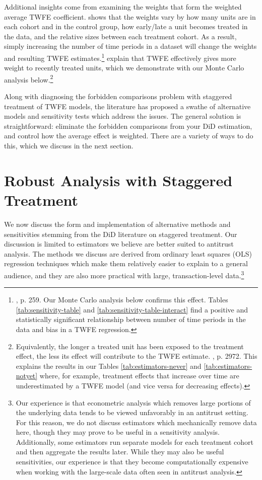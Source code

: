 \documentclass[12pt]{article}
\begin{document}
Additional insights come from examining the weights that form the weighted average TWFE coefficient. \citet{goodman-bacon2021a} shows that the weights vary by how many units are in each cohort and in the control group, how early/late a unit becomes treated in the data, and the relative sizes between each treatment cohort. As a result, simply increasing the number of time periods in a dataset will change the weights and resulting TWFE estimates.\footnote{\citet{goodman-bacon2021a}, p. 259. Our Monte Carlo analysis below confirms this effect. Tables \ref{tab:sensitivity-table} and \ref{tab:sensitivity-table-interact} find a positive and statistically significant relationship between number of time periods in the data and bias in a TWFE regression.} \citet{de2020two} explain that TWFE effectively gives more weight to recently treated units, which we demonstrate with our Monte Carlo analysis below.\footnote{Equivalently, the longer a treated unit has been exposed to the treatment effect, the less its effect will contribute to the TWFE estimate. \citet{de2020two}, p. 2972. This explains the results in our Tables \ref{tab:estimators-never} and \ref{tab:estimators-notyet} where, for example, treatment effects that increase over time are underestimated by a TWFE model (and vice versa for decreasing effects).}

Along with diagnosing the forbidden comparisons problem with staggered treatment of TWFE models, the literature has proposed a swathe of alternative models and sensitivity tests which address the issues. The general solution is straightforward: eliminate the forbidden comparisons from your DiD estimation, and control how the average effect is weighted. There are a variety of ways to do this, which we discuss in the next section.

\section{Robust Analysis with Staggered Treatment} \label{sec:equations}
We now discuss the form and implementation of alternative methods and sensitivities stemming from the DiD literature on staggered treatment. Our discussion is limited to estimators we believe are better suited to antitrust analysis. The methods we discuss are derived from ordinary least squares (OLS) regression techniques which make them relatively easier to explain to a general audience, and they are also more practical with large, transaction-level data.\footnote{Our experience is that econometric analysis which removes large portions of the underlying data tends to be viewed unfavorably in an antitrust setting. For this reason, we do not discuss estimators which mechanically remove data here, though they may prove to be useful in a sensitivity analysis. Additionally, some estimators run separate models for each treatment cohort and then aggregate the results later. While they may also be useful sensitivities, our experience is that they become computationally expensive when working with the large-scale data often seen in antitrust analysis.}
\end{document}
